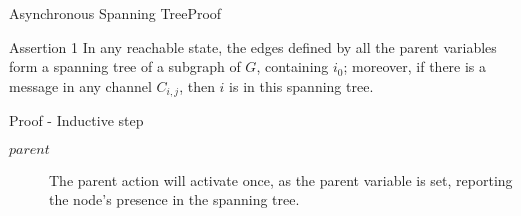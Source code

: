 \documentclass[pdf]{beamer}
\begin{document}
\begin{frame}[plain]{Asynchronous Spanning Tree}{Proof}
    \begin{block}{Assertion 1}
    In any reachable state, the edges defined by all the parent variables form a spanning tree
    of a subgraph of $G$, containing $i_0$; moreover, if there is a message in any channel $C_{i,j}$,
    then $i$ is in this spanning tree.
    \end{block}	
    \begin{block}{Proof - Inductive step}
    \begin{description}
    \item[$parent$]{The parent action will activate once, as the parent variable is set, reporting the node's presence in the spanning tree.}
    \end{description}
    \end{block}
\end{frame}
\end{document}

